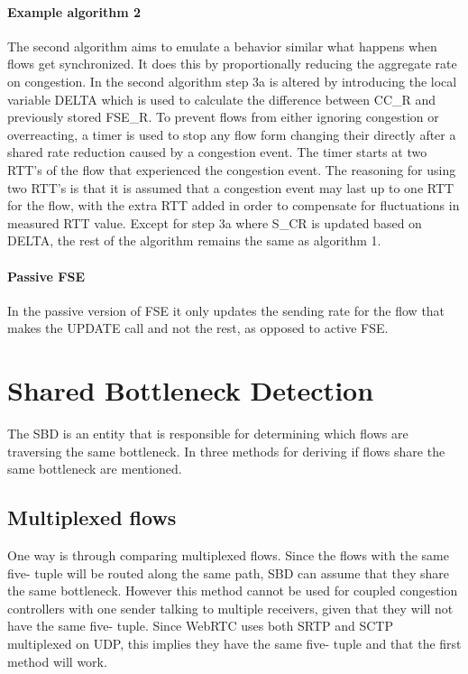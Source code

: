 \documentclass[UKenglish]{ifimaster}
\begin{document}
\paragraph{Example algorithm 2}
The second algorithm aims to emulate a behavior similar what happens when flows get synchronized.
It does this by proportionally reducing the aggregate rate on congestion.
In the second algorithm step 3a is altered by introducing the local variable DELTA which is used to calculate the difference between CC\_R and previously stored FSE\_R. 
To prevent flows from either ignoring congestion or overreacting, a timer is used to stop any flow form changing their directly after a shared rate reduction caused by a congestion event. 
The timer starts at two RTT's of the flow that experienced the congestion event.
The reasoning for using two RTT's is that it is assumed that a congestion event may last up to one RTT for the flow, with the extra RTT added in order to compensate for fluctuations in measured RTT value.
Except for step 3a where S\_CR is updated based on DELTA, the rest of the algorithm remains the same as algorithm 1.

\paragraph{Passive FSE}
In the passive version of FSE it only updates the sending rate for the flow that makes the UPDATE call and not the rest, as opposed to active FSE.
\section{Shared Bottleneck Detection}
The SBD is an entity that is responsible for determining which flows are traversing the same bottleneck. 
In \cite{rfc8699} three methods for deriving if flows share the same bottleneck are mentioned.

\subsection{Multiplexed flows}
One way is through comparing multiplexed flows. 
Since the flows with the same five- tuple will be routed along the same path, SBD can assume that they share the same bottleneck. 
However this method cannot be used for coupled congestion controllers with one sender talking to multiple receivers, given that they will not have the same five- tuple. 
Since WebRTC uses both SRTP and SCTP multiplexed on UDP, this implies they have the same five- tuple and that the first method will work. 
\end{document}
